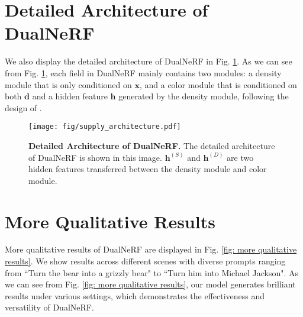 \section{Detailed Architecture of DualNeRF}
We also display the detailed architecture of DualNeRF in Fig. \ref{fig: detailed architecture}. As we can see from Fig. \ref{fig: detailed architecture}, each field in DualNeRF mainly contains two modules: a density module that is only conditioned on $\mathbf{x}$, and a color module that is conditioned on both $\mathbf{d}$ and a hidden feature $\mathbf{h}$ generated by the density module, following the design of \cite{mildenhall2021nerf}.

\begin{figure}[t]
    \centering
    \texttt{[image: fig/supply\_architecture.pdf]}
    \caption{\textbf{Detailed Architecture of DualNeRF.} The detailed architecture of DualNeRF is shown in this image. $\mathbf{h}^{(S)}$ and $\mathbf{h}^{(D)}$ are two hidden features transferred between the density module and color module.}
    \label{fig: detailed architecture}
\end{figure}

\section{More Qualitative Results}
\label{sec: More Qualitative Results}
More qualitative results of DualNeRF are displayed in Fig. \ref{fig: more qualitative results}. We show results across different scenes with diverse prompts ranging from ``Turn the bear into a grizzly bear" to ``Turn him into Michael Jackson". As we can see from Fig. \ref{fig: more qualitative results}, our model generates brilliant results under various settings, which demonstrates the effectiveness and versatility of DualNeRF.

